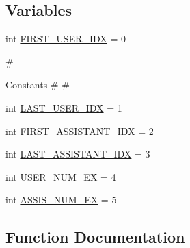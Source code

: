 \subsection*{Variables}
\begin{DoxyCompactItemize}
\item 
int \hyperlink{namespaceparlai_1_1tasks_1_1taskmaster_1_1tm__utils_a3d32eccf30e0e2b6162ebbf874048fa1}{F\+I\+R\+S\+T\+\_\+\+U\+S\+E\+R\+\_\+\+I\+DX} = 0
\begin{DoxyCompactList}\small\item\em \begin{DoxyVerb}                                                        #
\end{DoxyVerb}
 Constants \# \# \end{DoxyCompactList}\item 
int \hyperlink{namespaceparlai_1_1tasks_1_1taskmaster_1_1tm__utils_aca357e25fc9332dfc49ddbdee24ff75b}{L\+A\+S\+T\+\_\+\+U\+S\+E\+R\+\_\+\+I\+DX} = 1
\item 
int \hyperlink{namespaceparlai_1_1tasks_1_1taskmaster_1_1tm__utils_a04fbf1f7345d36a9aaec7d12939aaaa2}{F\+I\+R\+S\+T\+\_\+\+A\+S\+S\+I\+S\+T\+A\+N\+T\+\_\+\+I\+DX} = 2
\item 
int \hyperlink{namespaceparlai_1_1tasks_1_1taskmaster_1_1tm__utils_ad5b7d11e81386ebda37fb85e21ae9cdd}{L\+A\+S\+T\+\_\+\+A\+S\+S\+I\+S\+T\+A\+N\+T\+\_\+\+I\+DX} = 3
\item 
int \hyperlink{namespaceparlai_1_1tasks_1_1taskmaster_1_1tm__utils_a44bd1a37b8500c21821e726bd473bfc7}{U\+S\+E\+R\+\_\+\+N\+U\+M\+\_\+\+EX} = 4
\item 
int \hyperlink{namespaceparlai_1_1tasks_1_1taskmaster_1_1tm__utils_aa371c0c2363b889c2b0fddb418875835}{A\+S\+S\+I\+S\+\_\+\+N\+U\+M\+\_\+\+EX} = 5
\end{DoxyCompactItemize}


\subsection{Function Documentation}
\mbox{\label{namespaceparlai_1_1tasks_1_1taskmaster_1_1tm__utils_aad8e1c42802da1765887ff0407bed1b1}} 
